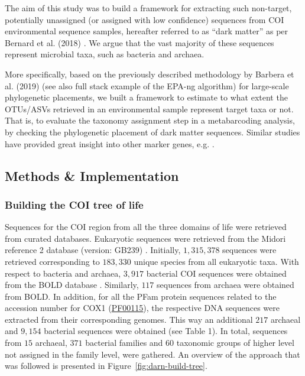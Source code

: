    The aim of this study was to build a framework for extracting such non-target, potentially unassigned (or assigned with low confidence) sequences from COI environmental sequence samples, hereafter referred to as “dark matter” as per Bernard et al. (2018) \citep{bernard2018microbial}. 
   We argue that the vast majority of these sequences represent microbial taxa, such as bacteria and archaea. 
   
   More specifically, based on the previously described methodology by Barbera et al. (2019) \citep{barbera2019epa} (see also full stack example of the EPA-ng algorithm) for large-scale phylogenetic placements, we built a framework to estimate to what extent the OTUs/ASVs retrieved in an environmental sample represent target taxa or not. 
   That is, to evaluate the taxonomy assignment step in a metabarcoding analysis, by checking the phylogenetic placement of dark matter sequences. Similar studies have provided great insight into other marker genes, e.g. \citep{jamy2020long}.


   \subsection{Methods \& Implementation}
   \label{sec:darn-methods}

   \subsubsection*{Building the COI tree of life}
   \label{subsec:darn-methods-tree}

   Sequences for the COI region from all the three domains of life were retrieved from curated databases. 
   Eukaryotic sequences were retrieved from the Midori reference 2 database (version: GB239) \citep{machida2017metazoan}. 
   Initially, $1,315,378$ sequences were retrieved corresponding to $183,330$ unique species from all eukaryotic taxa. 
   With respect to bacteria and archaea, $3,917$ bacterial COI sequences were obtained from the BOLD database \citep{ratnasingham2007bold}. 
   Similarly, $117$ sequences from archaea were obtained from BOLD. 
   In addition, for all the PFam protein sequences related to the accession number for 
   COX1 (\href{http://www.ncbi.nlm.nih.gov/nuccore/PF00115}{PF00115}), the respective DNA sequences were extracted from their corresponding genomes. 
   This way an additional $217$ archaeal and $9,154$ bacterial sequences were obtained (see Table 1). 
   In total, sequences from $15$ archaeal, $371$ bacterial families and 60 taxonomic groups of higher level not assigned in the family level, were gathered. 
   An overview of the approach that was followed is presented in Figure~\ref{fig:darn-build-tree}. 

